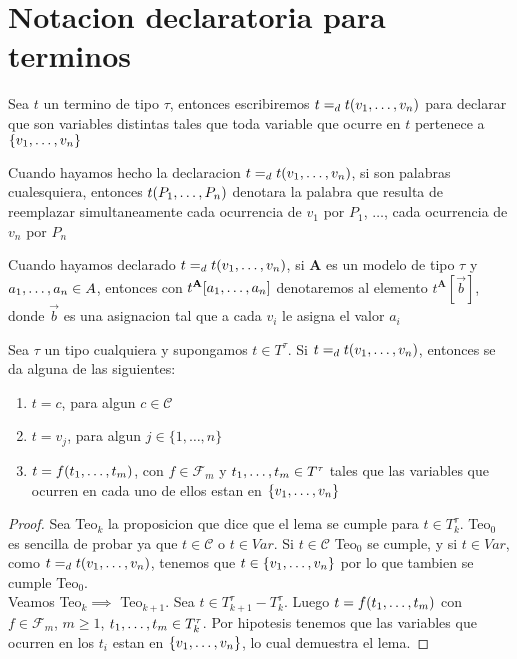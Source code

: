 
\section{Notacion declaratoria para terminos}
\begin{definition}
  Sea $t$ un termino de tipo $\tau$, entonces escribiremos $t =_d t(v_{1}, \dots, v_{n})$
  para declarar que  son variables distintas tales que toda variable que ocurre en 
  $t$ pertenece a $\{v_{1}, \dots, v_{n}\}$
\end{definition}

\begin{convention}
  Cuando hayamos hecho la declaracion $t =_d t(v_{1}, \dots, v_{n})$, si 
  son palabras cualesquiera, entonces $t(P_{1}, \dots, P_{n})$ denotara la palabra que resulta de reemplazar
  simultaneamente cada ocurrencia de $v_1$ por $P_1$, $\dots$, cada ocurrencia de $v_n$ por $P_n$
\end{convention}
\begin{convention}
  Cuando hayamos declarado $t =_d t(v_{1}, \dots, v_{n})$, si $\mathbf{A}$ es un modelo de 
  tipo $\tau$ y $a_{1}, \dots, a_{n} \in A$, entonces con $t^\mathbf{A}[a_{1}, \dots, a_{n}]$
  denotaremos al elemento $t^\mathbf{A}[\vec{b}]$, donde $\vec{b}$ es una asignacion tal que a cada
  $v_i$ le asigna el valor $a_i$
\end{convention}

\begin{lemma}
  Sea $\tau$ un tipo cualquiera y supongamos $t \in T^\tau$. Si $t =_d t(v_{1}, \dots, v_{n})$,
  entonces se da alguna de las siguientes: \begin{enumerate}
    \item $t = c$, para algun $c \in \mathcal{C}$
    \item $t = v_j$, para algun $j \in \{1,\dots,n\}$
    \item $t = f(t_{1}, \dots, t_{m})$, con $f \in \mathcal{F}_m$ y $t_{1}, \dots, t_{m} \in T^\tau$ tales
    que las variables que ocurren en cada uno de ellos estan en $\{v_{1}, \dots, v_{n}\}$
  \end{enumerate}
\end{lemma}
\begin{proof}
  Sea Teo$_k$ la proposicion que dice que el lema se cumple para $t \in T_k^\tau$.
  Teo$_0$ es sencilla de probar ya que $t \in \mathcal{C}$ o $t \in Var$. Si $t \in \mathcal{C}$ Teo$_0$ se cumple, 
  y si $t \in Var$, como $t = _d t(v_{1}, \dots, v_{n})$, tenemos que $t \in \{v_{1}, \dots, v_{n}\}$ por lo que tambien se cumple Teo$_0$.\\
  Veamos Teo$_k \implies$ Teo$_{k+1}$.  Sea $t \in T_{k+1}^\tau-T_k^\tau$. Luego $t = f(t_{1}, \dots, t_{m})$ con $f\in\mathcal{F}_m$, $m\geq 1$, $t_{1}, \dots, t_{m}\in T_k^\tau$.
  Por hipotesis tenemos que las variables que ocurren en los $t_i$ estan en $\{v_{1}, \dots, v_{n}\}$, lo cual demuestra el lema. 
\end{proof}

